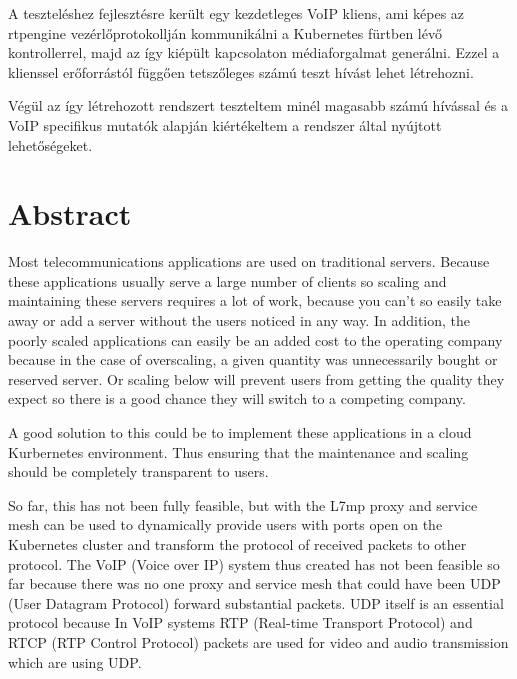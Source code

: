 A teszteléshez fejlesztésre került egy kezdetleges VoIP kliens, ami képes az 
rtpengine vezérlőprotokollján kommunikálni a Kubernetes fürtben lévő kontrollerrel, 
majd az így kiépült kapcsolaton médiaforgalmat generálni. Ezzel a klienssel 
erőforrástól függően tetszőleges számú teszt hívást lehet létrehozni. 

Végül az így létrehozott rendszert teszteltem minél magasabb számú hívással és a 
VoIP specifikus mutatók alapján kiértékeltem a rendszer által nyújtott lehetőségeket. 

\vfill
\selectenglish


\chapter*{Abstract}

Most telecommunications applications are used on traditional servers. Because these 
applications usually serve a large number of clients
so scaling and maintaining these servers requires a lot of work,
because you can’t so easily take away or add a server without the users noticed in
any way. In addition, the poorly scaled
applications can easily be an added cost to the operating company because
in the case of overscaling, a given quantity was unnecessarily bought or reserved
server. Or scaling below will prevent users from getting the quality they expect
so there is a good chance they will switch to a competing company.

A good solution to this could be to implement these applications
in a cloud Kurbernetes environment. Thus ensuring that the maintenance and
scaling should be completely transparent to users.

So far, this has not been fully feasible, but with the L7mp proxy and
service mesh can be used to dynamically provide users with ports
open on the Kubernetes cluster and transform the protocol of received packets to
other protocol. The VoIP (Voice over IP) system thus created has not been feasible so far 
because there was no one
proxy and service mesh that could have been UDP (User Datagram Protocol)
forward substantial packets. UDP itself is an essential protocol because
In VoIP systems RTP (Real-time Transport Protocol) and
RTCP (RTP Control Protocol) packets are used for video and
audio transmission which are using UDP.

